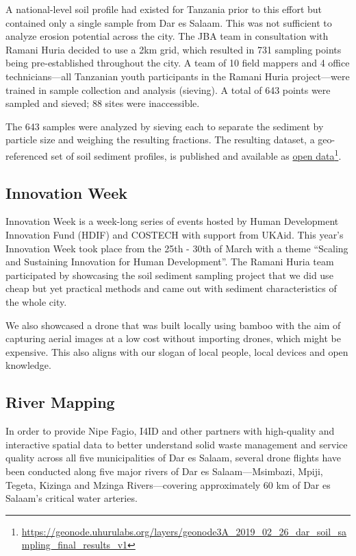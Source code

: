 \documentclass[a4paper,12pt,twoside]{article}
\begin{document}
\begin{multicols}{2}
A national-level soil profile had existed for Tanzania prior to this effort but contained only a single sample from Dar es Salaam. This was not sufficient to analyze erosion potential across the city. The JBA team in consultation with Ramani Huria decided to use a 2km grid, which resulted in 731 sampling points being pre-established throughout the city. A team of 10 field mappers and 4 office technicians—all Tanzanian youth participants in the Ramani Huria project—were trained in sample collection and analysis (sieving). A total of 643 points were sampled and sieved; 88 sites were inaccessible.


The 643 samples were analyzed by sieving each to separate the sediment by particle size and weighing the resulting fractions. The resulting dataset, a geo-referenced set of soil sediment profiles, is published and available as \href{https://geonode.uhurulabs.org/layers/geonode3A_2019_02_26_dar_soil_sampling_final_results_v1}{open data}\footnote{\url{https://geonode.uhurulabs.org/layers/geonode3A_2019_02_26_dar_soil_sampling_final_results_v1}}.

\subsection{Innovation Week}
Innovation Week is a week-long series of events hosted by Human Development Innovation Fund (HDIF) and COSTECH with support from UKAid. This year’s Innovation Week took place from the 25th - 30th of March with a theme “Scaling and Sustaining Innovation for Human Development”. The Ramani Huria team participated by showcasing the soil sediment sampling project that we did use cheap but yet practical methods and came out with sediment characteristics of the whole city.

We also showcased a drone that was built locally using bamboo with the aim of capturing aerial images at a low cost without importing drones, which might be expensive. This also aligns with our slogan of local people, local devices and open knowledge.

\subsection{River Mapping}
In order to provide Nipe Fagio, I4ID and other partners with high-quality and interactive spatial data to better understand solid waste management and service quality across all five municipalities of Dar es Salaam, several drone flights have been conducted along five major rivers of Dar es Salaam---Msimbazi, Mpiji, Tegeta, Kizinga and Mzinga Rivers---covering approximately 60 km of Dar es Salaam’s critical water arteries. 


\end{multicols}
\end{document}

